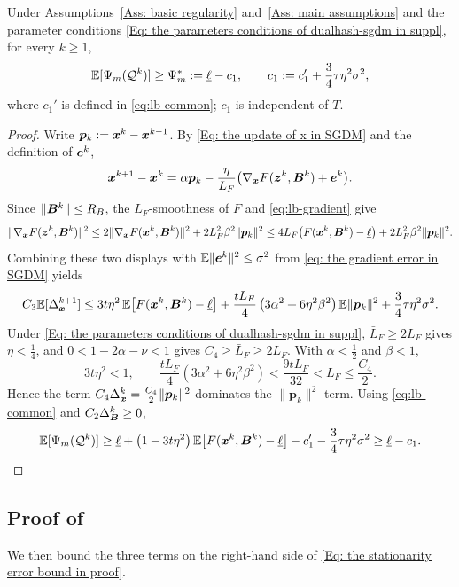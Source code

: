 \begin{lemma}
\label{Lemma: lower bound of Psi_m}
Under Assumptions~\ref{Ass: basic regularity} and~\ref{Ass: main assumptions} and the parameter conditions \eqref{Eq: the parameters conditions of dualhash-sgdm in suppl}, for every $k\ge1$,
\[
\mathbb{E}[\Psi_m(\mathcal{Q}^k)]\ge\Psi_m^*:=\underline{\ell}-c_1,
\qquad
c_1:=c_1'+\frac34\tau\eta^2\sigma^2,
\]
where $c_1'$ is defined in \eqref{eq:lb-common}; $c_1$ is independent of $T$.
\end{lemma}

\begin{proof}
Write $\bm{p}_k:=\bm{x}^k-\bm{x}^{k-1}$. By \eqref{Eq: the update of x in SGDM} and the definition of $\bm{e}^k$,
\[
\bm{x}^{k+1}-\bm{x}^k=\alpha\bm{p}_k-\frac{\eta}{L_F}\bigl(\nabla_{\bm{x}}F(\bm{z}^k,\bm{B}^k)+\bm{e}^k\bigr).
\]
Since $\|\bm{B}^k\|\le R_B$, the $L_F$-smoothness of $F$ and \eqref{eq:lb-gradient} give
\[
\|\nabla_{\bm{x}}F(\bm{z}^k,\bm{B}^k)\|^2\le2\|\nabla_{\bm{x}}F(\bm{x}^k,\bm{B}^k)\|^2+2L_F^2\beta^2\|\bm{p}_k\|^2
\le4L_F\bigl(F(\bm{x}^k,\bm{B}^k)-\underline{\ell}\bigr)+2L_F^2\beta^2\|\bm{p}_k\|^2 .
\]
Combining these two displays with $\mathbb{E}\|\bm{e}^k\|^2\le\sigma^2$ from \eqref{eq: the gradient error in SGDM} yields
\[
C_3\mathbb{E}[\Delta_{\bm{x}}^{k+1}]
\le3t\eta^2\,\mathbb{E}\bigl[F(\bm{x}^k,\bm{B}^k)-\underline{\ell}\bigr]
+\frac{tL_F}{4}\left(3\alpha^2+6\eta^2\beta^2\right)\mathbb{E}\|\bm{p}_k\|^2
+\frac34\tau\eta^2\sigma^2 .
\]
Under \eqref{Eq: the parameters conditions of dualhash-sgdm in suppl}, $\bar L_F\ge2L_F$ gives $\eta<\frac14$, and $0<1-2\alpha-\nu<1$ gives $C_4\ge\bar L_F\ge2L_F$. With $\alpha<\frac12$ and $\beta<1$,
\[
3t\eta^2<1,
\qquad
\frac{tL_F}{4}\left(3\alpha^2+6\eta^2\beta^2\right)<\frac{9tL_F}{32}<L_F\le\frac{C_4}{2}.
\]
Hence the term $C_4\Delta_{\bm{x}}^k=\frac{C_4}{2}\|\bm{p}_k\|^2$ dominates the $\|\bm{p}_k\|^2$-term. Using \eqref{eq:lb-common} and $C_2\Delta_{\bm{B}}^k\ge0$,
\[
\mathbb{E}[\Psi_m(\mathcal{Q}^k)]
\ge\underline{\ell}+\left(1-3t\eta^2\right)\mathbb{E}\bigl[F(\bm{x}^k,\bm{B}^k)-\underline{\ell}\bigr]-c_1'-\frac34\tau\eta^2\sigma^2
\ge\underline{\ell}-c_1 .
\]
\end{proof}
\endgroup

\subsection{Proof of }
\label{app:stom-rate-proof}
We then bound the three terms on the right-hand side of \eqref{Eq: the stationarity error bound in proof}.

